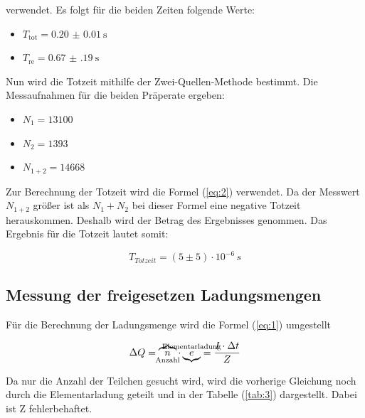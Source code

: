 verwendet. Es folgt für die beiden Zeiten folgende Werte:

\begin{itemize}
  \item $T_\text{tot} = \SI{0.20(1)}{\second}$
  \item $T_\text{re} = \SI{0.67(19)}{\second}$
\end{itemize}

Nun wird die Totzeit mithilfe der Zwei-Quellen-Methode bestimmt.
Die Messaufnahmen für die beiden Präperate ergeben:

\begin{itemize}
  \item $N_1 = 13100$
  \item $N_2 = 1393$
  \item $N_{1+2} = 14668$
\end{itemize}

Zur Berechnung der Totzeit wird die Formel (\ref{eq:2}) verwendet.
Da der Messwert $N_{1+2}$ größer ist als $N_1 + N_2$ bei dieser Formel eine
negative Totzeit herauskommen. Deshalb wird der Betrag des Ergebnisses genommen.
Das Ergebnis  für die Totzeit lautet somit:

\begin{equation*}
  T_{Totzeit} = (5 \pm 5) \cdot 10^{-6} \, s
\end{equation*}


\subsection{Messung der freigesetzen Ladungsmengen}

Für die Berechnung der Ladungsmenge wird die Formel (\ref{eq:1}) umgestellt

\begin{equation*}
  \Delta Q =\overbrace{n}_{\mathclap{\text{Anzahl}}} \cdot \underbrace{e}^{\mathclap{\text{Elementarladung}}} = \frac{I \cdot \Delta t}{Z}
\end{equation*}

Da nur die Anzahl der Teilchen gesucht wird, wird die vorherige Gleichung noch durch die Elementarladung geteilt und in der Tabelle (\ref{tab:3})
dargestellt. Dabei ist Z fehlerbehaftet.

